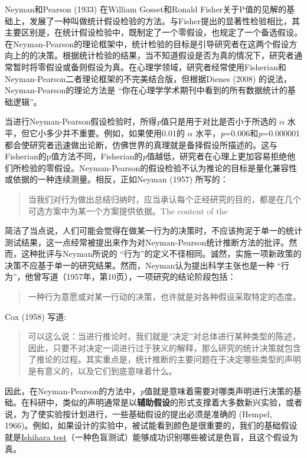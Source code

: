 \documentclass[
  letterpaper,
  DIV=11,
  numbers=noendperiod]{scrreprt}
\begin{document}
Neyman和Pearson (1933) 在William Gosset和Ronald
Fisher关于P值的见解的基础上，发展了一种叫做统计假设检验的方法。与Fisher提出的显著性检验相比，其主要区别是，在统计假设检验中，既制定了一个零假设，也规定了一个备选假设。在Neyman-Pearson的理论框架中，统计检验的目标是引导研究者在这两个假设方向上的的决策。根据统计检验的结果，当不知道假设是否为真的情况下，研究者通常暂时将零假设或备则假设为真。在心理学领域，研究者经常使用Fisherian和Neyman-Pearson二者理论框架的不完美结合版，但根据Dienes
(2008) 的说法，Neyman-Pearson的理论方法是
``你在心理学学术期刊中看到的所有数据统计的基础逻辑''。

当进行Neyman-Pearson假设检验时，所得\emph{p}值只是用于对比是否小于所选的
\(\alpha\) 水平，但它小多少并不重要。例如，如果使用0.01的 \(\alpha\)
水平，\emph{p}=0.006和\emph{p}=0.000001都会使研究者迅速做出论断，仿佛世界的真理就是备择假设所描述的。这与Fisherian的p值方法不同，Fisherian的\emph{p}值越低，研究者在心理上更加容易拒绝他们所检验的零假设。Neyman-Pearson的假设检验不认为推论的目标是量化兼容性或依据的一种连续测量。相反，正如Neyman
(1957) 所写的：

\begin{quote}
当我们对行为做出总结归纳时，应当承认每个正经研究的目的，都是在几个可选方案中为某一个方案提供依据。The
content of the
\end{quote}

简洁了当点说，人们可能会觉得在做某一行为的决策时，不应该拘泥于单一的统计测试结果，这一点经常被提出来作为对Neyman-Pearson统计推断方法的批评。然而，这种批评与Neyman所说的
``行为''的定义不径相同。诚然，实施一项新政策的决策不应基于单一的研究结果。然而，Neyman认为提出科学主张也是一种
``行为''，他曾写道（1957年，第10页），一项研究的结论阶段包括：

\begin{quote}
一种行为意愿或对某一行动的决策，也许就是对各种假设采取特定的态度。
\end{quote}

Cox (1958) 写道:

\begin{quote}
可以这么说：当进行推论时，我们就是''决定''对总体进行某种类型的陈述，因此，只要不对决定一词进行过于狭义的解释，那么研究的统计决策就包含了推论的过程。其实重点是，统计推断的主要问题在于决定哪些类型的声明是有意义的，以及它们到底意味着什么。
\end{quote}

因此，在Neyman-Pearson的方法中，\emph{p}值就是意味着需要对哪类声明进行决策的基础。在科研中，类似的声明通常是以\textbf{辅助假设}的形式支撑着大多数新兴实验，或者说，为了使实验按计划进行，一些基础假设的提出必须是准确的
(Hempel,
1966)。例如，如果设计的实验中，被试能看到颜色是很重要的，我们的基础假设就是\href{https://en.wikipedia.org/wiki/Ishihara_test}{Ishihara
test}（一种色盲测试）能够成功识别哪些被试是色盲，且这个假设为真。
\end{document}
